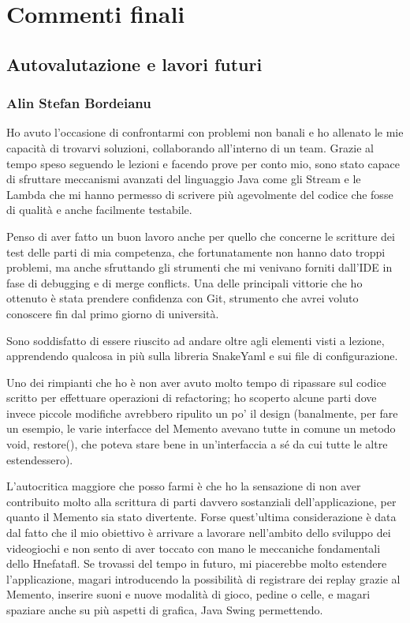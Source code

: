 \documentclass[a4paper,12pt]{report}
\begin{document}
\chapter{Commenti finali}


\section{Autovalutazione e lavori futuri}

\subsection{Alin Stefan Bordeianu}
Ho avuto l'occasione di confrontarmi con problemi non banali e ho allenato le mie capacità di trovarvi soluzioni, collaborando all'interno di un team. Grazie al tempo speso seguendo le lezioni e facendo prove per conto mio, sono stato capace di sfruttare meccanismi avanzati del linguaggio Java come gli Stream e le Lambda che mi hanno permesso di scrivere più agevolmente del codice che fosse di qualità e anche facilmente testabile.

Penso di aver fatto un buon lavoro anche per quello che concerne le scritture dei test delle parti di mia competenza, che fortunatamente non hanno dato troppi problemi, ma anche sfruttando gli strumenti che mi venivano forniti dall'IDE in fase di debugging e di merge conflicts. Una delle principali vittorie che ho ottenuto è stata prendere confidenza con Git, strumento che avrei voluto conoscere fin dal primo giorno di università. 

Sono soddisfatto di essere riuscito ad andare oltre agli elementi visti a lezione, apprendendo qualcosa in più sulla libreria SnakeYaml e sui file di configurazione. 

Uno dei rimpianti che ho è non aver avuto molto tempo di ripassare sul codice scritto per effettuare operazioni di refactoring; ho scoperto alcune parti dove invece piccole modifiche avrebbero ripulito un po' il design (banalmente, per fare un esempio, le varie interfacce del Memento avevano tutte in comune un metodo void, restore(), che poteva stare bene in un'interfaccia a sé da cui tutte le altre estendessero). 

L'autocritica maggiore che posso farmi è che ho la sensazione di non aver contribuito molto alla scrittura di parti davvero sostanziali dell'applicazione, per quanto il Memento sia stato divertente. Forse quest'ultima considerazione è data dal fatto che il mio obiettivo è arrivare a lavorare nell'ambito dello sviluppo dei videogiochi e non sento di aver toccato con mano le meccaniche fondamentali dello Hnefatafl. Se trovassi del tempo in futuro, mi piacerebbe molto estendere l'applicazione, magari introducendo la possibilità di registrare dei replay grazie al Memento, inserire suoni e nuove modalità di gioco, pedine o celle, e magari spaziare anche su più aspetti di grafica, Java Swing permettendo.
\end{document}
